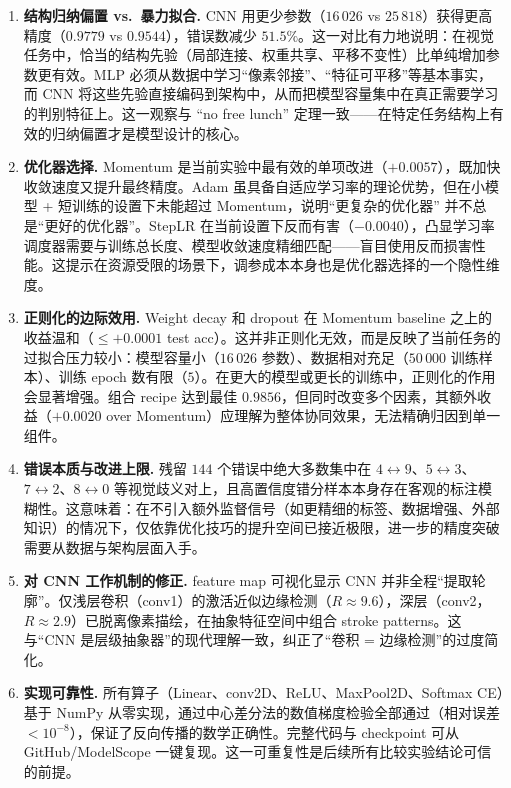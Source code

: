 \documentclass[11pt,fontset=fandol]{ctexart}
\begin{document}
\begin{enumerate}
    \item \textbf{结构归纳偏置 vs.\ 暴力拟合.}\;
    CNN 用更少参数（$16\,026$ vs $25\,818$）获得更高精度（$0.9779$ vs $0.9544$），错误数减少 $51.5\%$。这一对比有力地说明：在视觉任务中，恰当的结构先验（局部连接、权重共享、平移不变性）比单纯增加参数更有效。MLP 必须从数据中学习``像素邻接''、``特征可平移''等基本事实，而 CNN 将这些先验直接编码到架构中，从而把模型容量集中在真正需要学习的判别特征上。这一观察与 ``no free lunch'' 定理一致——在特定任务结构上有效的归纳偏置才是模型设计的核心。

    \item \textbf{优化器选择.}\;
    Momentum 是当前实验中最有效的单项改进（$+0.0057$），既加快收敛速度又提升最终精度。Adam 虽具备自适应学习率的理论优势，但在小模型 + 短训练的设置下未能超过 Momentum，说明``更复杂的优化器'' 并不总是``更好的优化器''。StepLR 在当前设置下反而有害（$-0.0040$），凸显学习率调度器需要与训练总长度、模型收敛速度精细匹配——盲目使用反而损害性能。这提示在资源受限的场景下，调参成本本身也是优化器选择的一个隐性维度。

    \item \textbf{正则化的边际效用.}\;
    Weight decay 和 dropout 在 Momentum baseline 之上的收益温和（$\le +0.0001$ test acc）。这并非正则化无效，而是反映了当前任务的过拟合压力较小：模型容量小（$16\,026$ 参数）、数据相对充足（$50\,000$ 训练样本）、训练 epoch 数有限（$5$）。在更大的模型或更长的训练中，正则化的作用会显著增强。组合 recipe 达到最佳 $0.9856$，但同时改变多个因素，其额外收益（$+0.0020$ over Momentum）应理解为整体协同效果，无法精确归因到单一组件。

    \item \textbf{错误本质与改进上限.}\;
    残留 $144$ 个错误中绝大多数集中在 $4{\leftrightarrow}9$、$5{\leftrightarrow}3$、$7{\leftrightarrow}2$、$8{\leftrightarrow}0$ 等视觉歧义对上，且高置信度错分样本本身存在客观的标注模糊性。这意味着：在不引入额外监督信号（如更精细的标签、数据增强、外部知识）的情况下，仅依靠优化技巧的提升空间已接近极限，进一步的精度突破需要从数据与架构层面入手。

    \item \textbf{对 CNN 工作机制的修正.}\;
    feature map 可视化显示 CNN 并非全程``提取轮廓''。仅浅层卷积（conv1）的激活近似边缘检测（$R \approx 9.6$），深层（conv2，$R \approx 2.9$）已脱离像素描绘，在抽象特征空间中组合 stroke patterns。这与``CNN 是层级抽象器''的现代理解一致，纠正了``卷积 = 边缘检测''的过度简化。

    \item \textbf{实现可靠性.}\;
    所有算子（Linear、conv2D、ReLU、MaxPool2D、Softmax CE）基于 NumPy 从零实现，通过中心差分法的数值梯度检验全部通过（相对误差 $< 10^{-8}$），保证了反向传播的数学正确性。完整代码与 checkpoint 可从 GitHub/ModelScope 一键复现。这一可重复性是后续所有比较实验结论可信的前提。
\end{enumerate}
\end{document}

